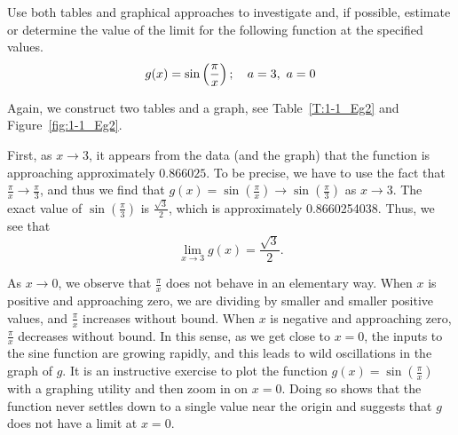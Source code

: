 \begin{example} \label{Ex:1.1.Eg2}
Use both tables and graphical approaches to investigate and, if possible, estimate or determine the value of the limit for the following function at the specified values. 
\[ \displaystyle g(x) = \sin\left( \frac{\pi}{x} \right); \quad a = 3, \ a = 0\]

\solution Again, we construct two tables and a graph, see Table~\ref{T:1-1_Eg2} and Figure~\ref{fig:1-1_Eg2}.

First, as $x \to 3$, it appears from the data (and the graph) that the function is approaching approximately $0.866025$.  To be precise, we have to use the fact that $\frac{\pi}{x} \to \frac{\pi}{3}$, and thus we find that $g(x) = \sin(\frac{\pi}{x}) \to \sin(\frac{\pi}{3})$ as $x \to 3$.  The exact value of $\sin(\frac{\pi}{3})$ is $\frac{\sqrt{3}}{2}$, which is approximately 0.8660254038.  Thus, we see that
$$\lim_{x \to 3} g(x) = \frac{\sqrt{3}}{2}.$$

As $x \to 0$, we observe that $\frac{\pi}{x}$ does not behave in an elementary way.  When $x$ is positive and approaching zero, we are dividing by smaller and smaller positive values, and $\frac{\pi}{x}$ increases without bound.  When $x$ is negative and approaching zero, $\frac{\pi}{x}$ decreases without bound.  In this sense, as we get close to $x = 0$, the inputs to the sine function are growing rapidly, and this leads to wild oscillations in the graph of $g$.  It is an instructive exercise to plot the function $g(x) = \sin\left(\frac{\pi}{x}\right)$ with a graphing utility and then zoom in on $x = 0$.  Doing so shows that the function never settles down to a single value near the origin and suggests that $g$ does not have a limit at $x = 0$.
\end{example}